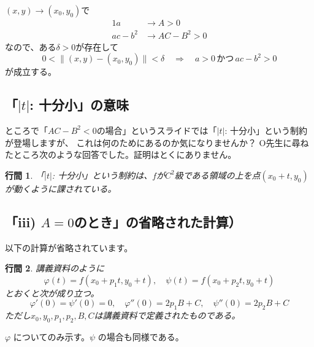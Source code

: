 \documentclass{article}
\makeatletter
\renewenvironment{proof}[1][\proofname]{\par
        \pushQED{\qed}
        \normalfont
        \topsep6\p@\@plus6\p@ \trivlist
        \item[\hskip\labelsep{\bfseries #1}\@addpunct{\bfseries}]\ignorespaces
    }{%
        \popQED\endtrivlist\@endpefalse
    }
\renewcommand{\proofname}{\underline{証明.}}
\newtheorem{lemma}{行間}
\makeatother
\begin{document}
\begin{proof}
    $(x, y) \rightarrow (x_0, y_0)$で
    \begin{alignat}{1}
        a &\rightarrow A > 0 \\
        ac - b^2 &\rightarrow AC - B^2 > 0
    \end{alignat}
    なので、ある$\delta > 0$が存在して
    \begin{equation}
        0 < \| (x, y) - (x_0, y_0) \| < \delta
        \quad \Longrightarrow \quad
        a > 0
        \,\mbox{かつ}\,
        ac - b^2 > 0
    \end{equation}
    が成立する。
\end{proof}

\subsection{「$|t|$: 十分小」の意味}
ところで「$AC-B^2<0$の場合」というスライドでは「$|t|$: 十分小」という制約が登場しますが、
これは何のためにあるのか気になりませんか？
O先生に尋ねたところ次のような回答でした。証明はとくにありません。
\begin{screen}
    \begin{lemma}
        「$|t|$: 十分小」という制約は、$f$が$C^2$級である領域の上を点$(x_0 + t, y_0)$が動くように課されている。
    \end{lemma}
\end{screen}

\subsection{「iii) $A=0$のとき」の省略された計算）}
以下の計算が省略されています。
\begin{screen}
    \begin{lemma}
        講義資料のように
        \begin{equation}
            \varphi(t) = f(x_0 + p_1 t, y_0 + t),
            \quad
            \psi(t)    = f(x_0 + p_2 t, y_0 + t)
        \end{equation}
        とおくと次が成り立つ。
        \begin{equation}
            \varphi'(0) = \psi'(0) = 0,
            \quad
            \varphi''(0) = 2p_1 B + C,
            \quad
            \psi''(0)    = 2p_2 B + C
        \end{equation}
        ただし$x_0, y_0, p_1, p_2, B, C$は講義資料で定義されたものである。
    \end{lemma}
\end{screen}

\begin{proof}
    $\varphi$ についてのみ示す。$\psi$ の場合も同様である。
\end{proof}
\end{document}
